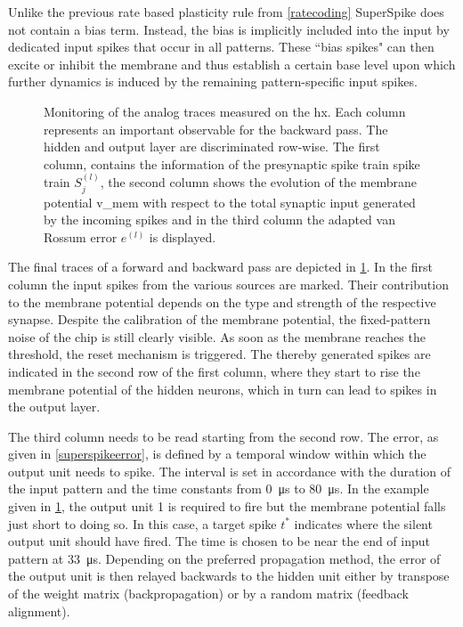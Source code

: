 Unlike the previous rate based plasticity rule from \cref{ratecoding} SuperSpike does not contain a bias term. Instead, the bias is implicitly included into the input by dedicated input spikes that occur in all patterns. These ``bias spikes" can then excite or inhibit the membrane and thus establish a certain base level upon which further dynamics is induced by the remaining pattern-specific input spikes.

\begin{figure}[htb!]
	\centering
	
	\caption[Monitoring of the analog traces measured on the \gls{hx}.]{Monitoring of the analog traces measured on the \gls{hx}. Each column represents an important observable for the backward pass. The hidden and output layer are discriminated row-wise. The first column, contains the information of the presynaptic spike train spike train $S_j^{(l)}$, the second column shows the evolution of the membrane potential \gls{v_mem} with respect to the total synaptic input generated by the incoming spikes and in the third column the adapted van Rossum error $e^{(l)}$ is displayed.}
	\label{debugplot}
\end{figure}

The final traces of a forward and backward pass are depicted in \cref{debugplot}. In the first column the input spikes from the various sources are marked. Their contribution to the membrane potential depends on the type and strength of the respective synapse. Despite the calibration of the membrane potential, the fixed-pattern noise of the chip is still clearly visible. As soon as the membrane reaches the threshold, the reset mechanism is triggered. The thereby generated spikes are indicated in the second row of the first column, where they start to rise the membrane potential of the hidden neurons, which in turn can lead to spikes in the output layer.

The third column needs to be read starting from the second row. The error, as given in \cref{superspikeerror}, is defined by a temporal window within which the output unit needs to spike.
The interval is set in accordance with the duration of the input pattern and the time constants from \SI{0}{\micro \s} to \SI{80}{\micro \s}. In the example given in \cref{debugplot}, the output unit 1 is required to fire but the membrane potential falls just short to doing so. In this case, a target spike $t^*$ indicates where the silent output unit should have fired. The time is chosen to be near the end of input pattern at \SI{33}{\micro \s}. Depending on the preferred propagation method, the error of the output unit is then relayed backwards to the hidden unit either by transpose of the weight matrix (backpropagation) or by a random matrix (feedback alignment).

